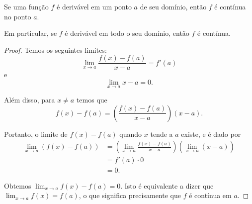 \begin{theorem}
	Se uma função $f$ é derivável em um ponto $a$ de seu domínio, então $f$ é contínua no ponto $a$.
	
	Em particular, se $f$ é derivável em todo o seu domínio, então $f$ é contínua.
\end{theorem}

\begin{proof}
	Temos os seguintes limites:
	\[\lim_{x\to a}\frac{f(x)-f(a)}{x-a}=f'(a)\]
	e
	\[\lim_{x\to a}x-a=0.\]
	
	Além disso, para $x\neq a$ temos que
	\[f(x)-f(a)=\left(\frac{f(x)-f(a)}{x-a}\right)(x-a).\]
	
	Portanto, o limite de $f(x)-f(a)$ quando $x$ tende a $a$ existe, e é dado por
	\begin{align*}
		\lim_{x\to a}\left(f(x)-f(a)\right)
			&=\left(\lim_{x\to a}\frac{f(x)-f(a)}{x-a}\right)\left(\lim_{x\to a}(x-a)\right)\\
			&=f'(a)\cdot 0\\
			&=0.
	\end{align*}
	
	Obtemos $\lim_{x\to a}f(x)-f(a)=0$. Isto é equivalente a dizer que $\lim_{x\to a}f(x)=f(a)$, o que significa precisamente que $f$ é contínua em $a$.
\end{proof}